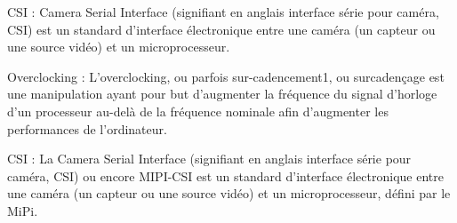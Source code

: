 \begin{definition}

    CSI : Camera Serial Interface (signifiant en anglais interface série pour caméra, CSI) est un standard d'interface électronique entre une caméra (un capteur ou une source vidéo) et un microprocesseur.
    
\end{definition}

\begin{definition}
    Overclocking : L'overclocking, ou parfois sur-cadencement1, ou surcadençage est une manipulation ayant pour but d'augmenter la fréquence du signal d'horloge d'un processeur au-delà de la fréquence nominale afin d'augmenter les performances de l'ordinateur.
\end{definition}

\begin{definition}
    CSI : La Camera Serial Interface (signifiant en anglais interface série pour caméra, CSI) ou encore MIPI-CSI est un standard d'interface électronique entre une caméra (un capteur ou une source vidéo) et un microprocesseur, défini par le MiPi.
\end{definition}

